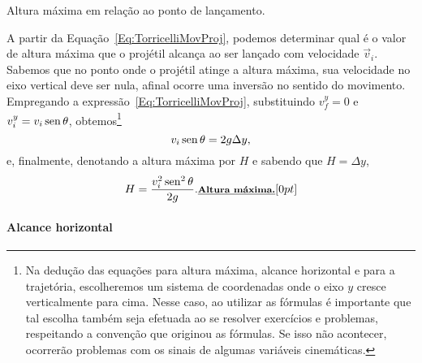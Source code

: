\begin{marginfigure}
\centering
{}
\caption{Altura máxima em relação ao ponto de lançamento.}
\end{marginfigure}

A partir da Equação~\eqref{Eq:TorricelliMovProj}, podemos determinar qual é o valor de altura máxima que o projétil alcança ao ser lançado com velocidade $\vec{v}_i$. Sabemos que no ponto onde o projétil atinge a altura máxima, sua velocidade no eixo vertical deve ser nula, afinal ocorre uma inversão no sentido do movimento. Empregando a expressão~\eqref{Eq:TorricelliMovProj}, substituindo $v_{f}^{y} = 0$ e $v_{i}^{y} = v_i\operatorname{sen}\theta$, obtemos\footnote[][-1cm]{Na dedução das equações para altura máxima, alcance horizontal e para a trajetória, escolheremos um sistema de coordenadas onde o eixo $y$ cresce verticalmente para cima. Nesse caso, ao utilizar as fórmulas é importante que tal escolha também seja efetuada ao se resolver exercícios e problemas, respeitando a convenção que originou as fórmulas. Se isso não acontecer, ocorrerão problemas com os sinais de algumas variáveis cinemáticas.}
\begin{equation}
  v_i\operatorname{sen}\theta = 2g\Delta y,
\end{equation}
%
e, finalmente, denotando a altura máxima por $H$ e sabendo que $H = \Delta y$,
\begin{equation}
  H = \frac{v_i^2\operatorname{sen}^2\theta}{2g}. \relax{\footnotesize\emph{\textbf{Altura máxima.}}}[0pt]
\end{equation}

\paragraph{Alcance horizontal}

